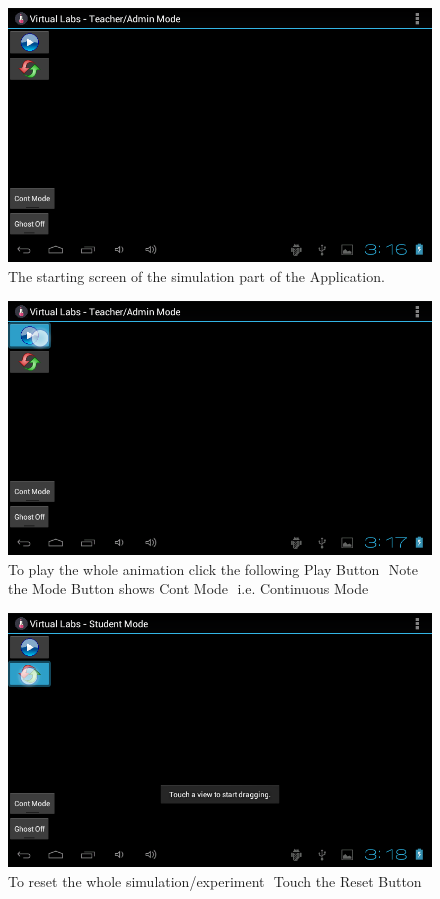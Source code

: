 \documentclass[12pt]{report}
\begin{document}
\begin{figure}[H]
 \centering
 \includegraphics[width=15cm]{./101.png}
 \caption{The starting screen of the simulation part of the Application.\label{fig:101}}
\end{figure}

\begin{figure}[H]
 \centering
 \includegraphics[width=15cm]{./102.png}
 \caption{To play the whole animation click the following Play Button ­ Note the Mode Button shows Cont Mode ­ i.e. Continuous Mode
\label{fig:102}}
\end{figure}

\begin{figure}[H]
 \centering
 \includegraphics[width=15cm]{./103.png}
 \caption{To reset the whole simulation/experiment ­ Touch the Reset Button\label{fig:103}}
\end{figure}
\end{document}

